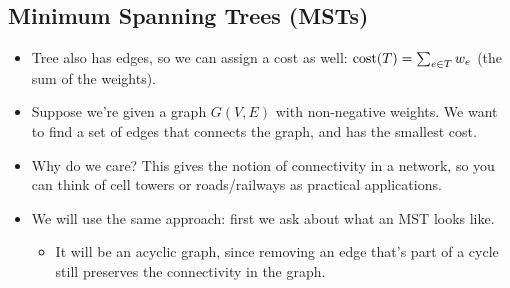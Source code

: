 	\subsection{Minimum Spanning Trees (MSTs)}
	\begin{itemize}
		\item Tree also has edges, so we can assign a cost as well: $\mathrm{cost}(T) = \sum_{e \in T} w_e$ (the 
			sum of the weights).
		\item Suppose we're given a graph $G(V, E)$ with non-negative weights. We want to find a set of edges
			that connects the graph, and has the smallest cost. 
		\item Why do we care? This gives the notion of connectivity in a network, so you can think of cell 
			towers or roads/railways as practical applications.
		\item We will use the same approach: first we ask about what an MST looks like.
			\begin{itemize}
				\item It will be an acyclic graph, since removing an edge that's part of a cycle still preserves
					the connectivity in the graph.
			\end{itemize}
	\end{itemize}
